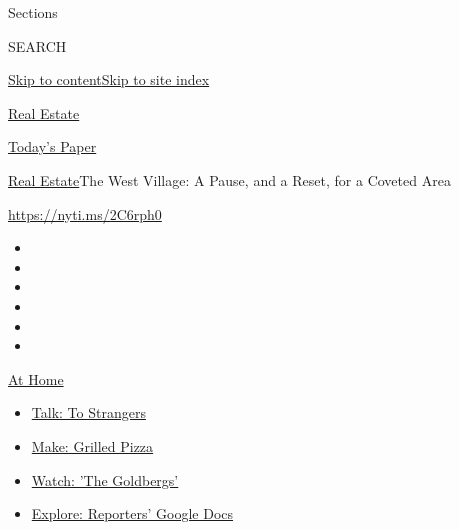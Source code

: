 Sections

SEARCH

\protect\hyperlink{site-content}{Skip to
content}\protect\hyperlink{site-index}{Skip to site index}

\href{https://www.nytimes3xbfgragh.onion/section/realestate}{Real
Estate}

\href{https://myaccount.nytimes3xbfgragh.onion/auth/login?response_type=cookie\&client_id=vi}{}

\href{https://www.nytimes3xbfgragh.onion/section/todayspaper}{Today's
Paper}

\href{/section/realestate}{Real Estate}\textbar{}The West Village: A
Pause, and a Reset, for a Coveted Area

\url{https://nyti.ms/2C6rph0}

\begin{itemize}
\item
\item
\item
\item
\item
\item
\end{itemize}

\href{https://www.nytimes3xbfgragh.onion/spotlight/at-home?action=click\&pgtype=Article\&state=default\&region=TOP_BANNER\&context=at_home_menu}{At
Home}

\begin{itemize}
\tightlist
\item
  \href{https://www.nytimes3xbfgragh.onion/2020/08/03/well/family/the-benefits-of-talking-to-strangers.html?action=click\&pgtype=Article\&state=default\&region=TOP_BANNER\&context=at_home_menu}{Talk:
  To Strangers}
\item
  \href{https://www.nytimes3xbfgragh.onion/2020/08/01/at-home/coronavirus-make-pizza-on-a-grill.html?action=click\&pgtype=Article\&state=default\&region=TOP_BANNER\&context=at_home_menu}{Make:
  Grilled Pizza}
\item
  \href{https://www.nytimes3xbfgragh.onion/2020/07/31/arts/television/goldbergs-abc-stream.html?action=click\&pgtype=Article\&state=default\&region=TOP_BANNER\&context=at_home_menu}{Watch:
  'The Goldbergs'}
\item
  \href{https://www.nytimes3xbfgragh.onion/interactive/2020/at-home/even-more-reporters-editors-diaries-lists-recommendations.html?action=click\&pgtype=Article\&state=default\&region=TOP_BANNER\&context=at_home_menu}{Explore:
  Reporters' Google Docs}
\end{itemize}

